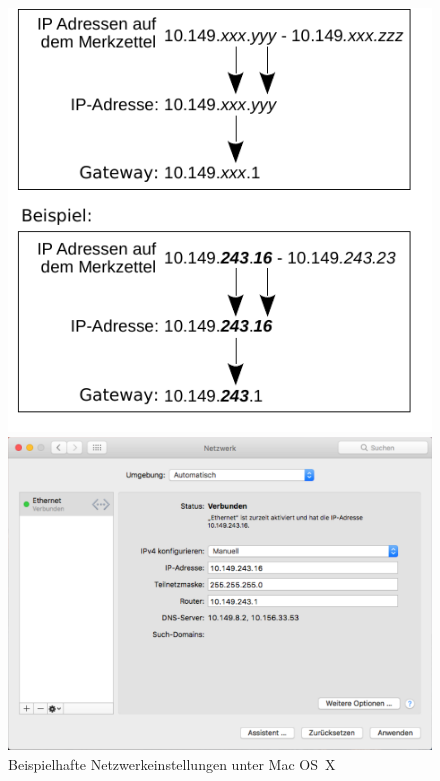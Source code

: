 \documentclass[a4paper,12pt]{scrartcl}
\begin{document}
\begin{enumerate}
\begin{figure}[h!]
\begin{minipage}[c]{0.38\linewidth}
          \includegraphics[width=\linewidth,keepaspectratio]{Bilder/IP_Gerneric_mb}
        \end{minipage}
        \begin{minipage}[c]{0.60\linewidth}
          \centering
          \includegraphics[width=0.9\linewidth,keepaspectratio]{Bilder/IP_MAC_mb}
          \caption{Beispielhafte Netzwerkeinstellungen unter Mac OS~X}
        \end{minipage}
      \vspace{-20pt}
      \end{figure}
\end{enumerate}
\vspace{-15pt}
\end{document}
